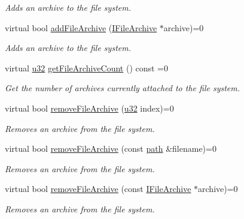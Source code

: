 \begin{DoxyCompactItemize}
\begin{DoxyCompactList}\small\item\em Adds an archive to the file system. \end{DoxyCompactList}\item 
virtual bool \hyperlink{classirr_1_1io_1_1IFileSystem_aedecc2c6f4c567de8bbe54fd711f7143}{add\+File\+Archive} (\hyperlink{classirr_1_1io_1_1IFileArchive}{I\+File\+Archive} $\ast$archive)=0
\begin{DoxyCompactList}\small\item\em Adds an archive to the file system. \end{DoxyCompactList}\item 
\mbox{\label{classirr_1_1io_1_1IFileSystem_a85862865f72b1e187402365e4236dce0}} 
virtual \hyperlink{namespaceirr_a0416a53257075833e7002efd0a18e804}{u32} \hyperlink{classirr_1_1io_1_1IFileSystem_a85862865f72b1e187402365e4236dce0}{get\+File\+Archive\+Count} () const =0
\begin{DoxyCompactList}\small\item\em Get the number of archives currently attached to the file system. \end{DoxyCompactList}\item 
virtual bool \hyperlink{classirr_1_1io_1_1IFileSystem_aa509623756c9bcbc3a9bcf455ea2a3ba}{remove\+File\+Archive} (\hyperlink{namespaceirr_a0416a53257075833e7002efd0a18e804}{u32} index)=0
\begin{DoxyCompactList}\small\item\em Removes an archive from the file system. \end{DoxyCompactList}\item 
virtual bool \hyperlink{classirr_1_1io_1_1IFileSystem_a03b405c8f5346c225c590cde585eb73c}{remove\+File\+Archive} (const \hyperlink{namespaceirr_1_1io_a6468281622ce3a1c46b72e19f32dded5}{path} \&filename)=0
\begin{DoxyCompactList}\small\item\em Removes an archive from the file system. \end{DoxyCompactList}\item 
virtual bool \hyperlink{classirr_1_1io_1_1IFileSystem_ab7579f5ccca7bc7c1e079f5cb38173ed}{remove\+File\+Archive} (const \hyperlink{classirr_1_1io_1_1IFileArchive}{I\+File\+Archive} $\ast$archive)=0
\begin{DoxyCompactList}\small\item\em Removes an archive from the file system. \end{DoxyCompactList}\item 

\end{DoxyCompactItemize}
